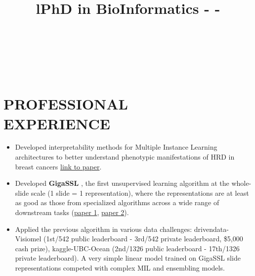 \documentclass[margin]{res}
\begin{document}
\begin{resume}
\begin{format}
\title{l}\\
\\
\body\\
\end{format}
\par
\section{PROFESSIONAL\\EXPERIENCE}
    \title{\textbf{PhD in BioInformatics - \href{https://theses.hal.science/tel-04694319v1}{\Large \faBook} - \href{https://drive.google.com/file/d/14Oqe85fIGDevRWF5WRY1IB2L6Tr49YMN/view?usp=sharing}{\Large \faFilePowerpointO}}}
\begin{position}

\begin{itemize}

    \item Developed interpretability methods for Multiple Instance Learning architectures to better understand phenotypic manifestations of HRD in breast cancers \href{https://doi.org/10.1016/j.xcrm.2022.100872}{link to paper}.
    
    \item Developed \textbf{ GigaSSL }, the first unsupervised learning algorithm at the whole-slide scale (1 slide = 1 representation), where the representations are at least as good as those from specialized algorithms across a wide range of downstream tasks (\href{https://arxiv.org/abs/2212.03273}{paper 1}, \href{https://www.biorxiv.org/content/10.1101/2023.12.04.569894v1.abstract}{paper 2}).
    
    \item Applied the previous algorithm in various data challenges: drivendata-Visiomel (1st/542 public leaderboard - 3rd/542 private leaderboard, \$5,000 cash prize), kaggle-UBC-Ocean (2nd/1326 public leaderboard - 17th/1326 private leaderboard). A very simple linear model trained on GigaSSL slide representations competed with complex MIL and ensembling models.
\end{itemize}


\end{position}
\end{resume}
\end{document}
